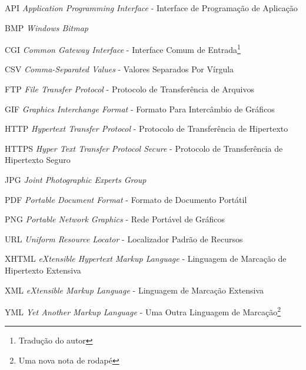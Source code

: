 \begin{siglas}
	\item[API] \textit{Application Programming Interface} - Interface de Programação de Aplicação
	\item[BMP] \textit{Windows Bitmap}
	\item[CGI] \textit{Common Gateway Interface} - Interface Comum de Entrada\footnote{Tradução do autor}
	\item[CSV] \textit{Comma-Separated Values} - Valores Separados Por Vírgula\footnotemark[1]
	\item[FTP] \textit{File Transfer Protocol} - Protocolo de Transferência de Arquivos
	\item[GIF] \textit{Graphics Interchange Format} - Formato Para Intercâmbio de Gráficos\footnotemark[1]
	\item[HTTP] \textit{Hypertext Transfer Protocol} - Protocolo de Transferência de Hipertexto
	\item[HTTPS] \textit{Hyper Text Transfer Protocol Secure} - Protocolo de Transferência de Hipertexto Seguro
	\item[JPG] \textit{Joint Photographic Experts Group}
	\item[PDF] \textit{Portable Document Format} - Formato de Documento Portátil\footnotemark[1]
	\item[PNG] \textit{Portable Network Graphics} - Rede Portável de Gráficos\footnotemark[1]
	\item[URL] \textit{Uniform Resource Locator} - Localizador Padrão de Recursos
	\item[XHTML] \textit{eXtensible Hypertext Markup Language} - Linguagem de Marcação de Hipertexto Extensiva
	\item[XML] \textit{eXtensible Markup Language} - Linguagem de Marcação Extensiva
	\item[YML] \textit{Yet Another Markup Language} - Uma Outra Linguagem de Marcação\footnote{Uma nova nota de rodapé}
\end{siglas}

